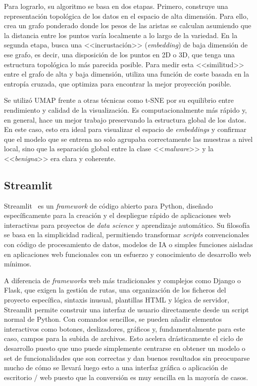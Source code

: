 Para lograrlo, su algoritmo se basa en dos etapas. Primero, construye una representación topológica de los datos en el espacio de alta dimensión. Para ello, crea un grafo ponderado donde los pesos de las aristas se calculan asumiendo que la distancia entre los puntos varía localmente a lo largo de la variedad. En la segunda etapa, busca una <<incrustación>> (\textit{embedding}) de baja dimensión de ese grafo, es decir, una disposición de los puntos en 2D o 3D, que tenga una estructura topológica lo más parecida posible. Para medir esta <<similitud>> entre el grafo de alta y baja dimensión, utiliza una función de coste basada en la entropía cruzada, que optimiza para encontrar la mejor proyección posible.

Se utilizó UMAP frente a otras técnicas como t-SNE por su equilibrio entre rendimiento y calidad de la visualización. Es computacionalmente más rápido y, en general, hace un mejor trabajo preservando la estructura global de los datos. En este caso, esto era ideal para visualizar el espacio de \textit{embeddings} y confirmar que el modelo que se entrena no solo agrupaba correctamente las muestras a nivel local, sino que la separación global entre la clase <<\textit{malware}>> y la <<\textit{benigna}>> era clara y coherente.

\subsection{Streamlit}


Streamlit~\cite{streamlitDocs} es un \textit{framework} de código abierto para Python, diseñado específicamente para la creación y el despliegue rápido de aplicaciones web interactivas para proyectos de \textit{data science} y aprendizaje automático. Su filosofía se basa en la simplicidad radical, permitiendo transformar \textit{scripts} convencionales con código de procesamiento de datos, modelos de IA o simples funciones aisladas en aplicaciones web funcionales con un esfuerzo y conocimiento de desarrollo web mínimos.

A diferencia de \textit{frameworks} web más tradicionales y complejos como Django o Flask, que exigen la gestión de rutas, una organización de los ficheros del proyecto específica, sintaxis inusual, plantillas HTML y lógica de servidor, Streamlit permite construir una interfaz de usuario directamente desde un script normal de Python. Con comandos sencillos, se pueden añadir elementos interactivos como botones, deslizadores, gráficos y, fundamentalmente para este caso, campos para la subida de archivos. Esto acelera drásticamente el ciclo de desarrollo puesto que uno puede simplemente centrarse en obtener un modelo o set de funcionalidades que son correctas y dan buenos resultados sin preocuparse mucho de cómo se llevará luego esto a una interfaz gráfica o aplicación de escritorio / web puesto que la conversión es muy sencilla en la mayoría de casos.

